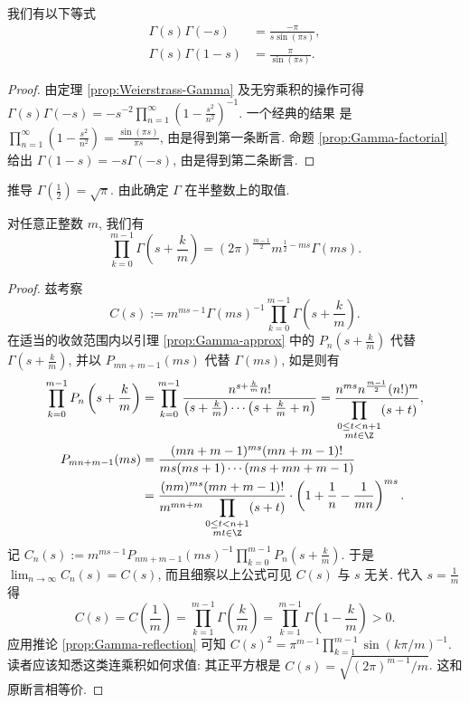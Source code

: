 \begin{corollary}\label{prop:Gamma-reflection}
	我们有以下等式
	\begin{align*}
		\Gamma(s)\Gamma(-s) & = \frac{-\pi}{s \sin(\pi s)}, \\
		\Gamma(s)\Gamma(1-s) & = \frac{\pi}{\sin(\pi s)}.
	\end{align*}
\end{corollary}
\begin{proof}
	由定理 \ref{prop:Weierstrass-Gamma} 及无穷乘积的操作可得 $\Gamma(s)\Gamma(-s) = -s^{-2} \prod_{n=1}^\infty \left( 1 - \frac{s^2}{n^2} \right)^{-1}$. 一个经典的结果 \cite[\S 1.7 (3)]{GW} 是 $\prod_{n=1}^\infty \left( 1 - \frac{s^2}{n^2} \right) = \frac{\sin(\pi s)}{\pi s}$, 由是得到第一条断言. 命题 \ref{prop:Gamma-factorial} 给出 $\Gamma(1-s) = -s\Gamma(-s)$, 由是得到第二条断言.
\end{proof}

\begin{exercise}
	推导 $\Gamma\left(\frac{1}{2}\right) = \sqrt{\pi}$. 由此确定 $\Gamma$ 在半整数上的取值.
\end{exercise}

\begin{theorem}[乘积公式]\label{prop:Gamma-mult}
	对任意正整数 $m$, 我们有
	\[ \prod_{k=0}^{m-1} \Gamma\left(s + \frac{k}{m} \right) = (2\pi)^{\frac{m-1}{2}} m^{\frac{1}{2} - ms} \Gamma(ms). \]
\end{theorem}
\begin{proof}
	兹考察
	\[ C(s) := m^{ms-1} \Gamma(ms)^{-1} \prod_{k=0}^{m-1} \Gamma\left(s + \frac{k}{m} \right). \]
	在适当的收敛范围内以引理 \ref{prop:Gamma-approx} 中的 $P_n\left(s + \frac{k}{m}\right)$ 代替 $\Gamma\left(s + \frac{k}{m}\right)$, 并以 $P_{mn+m-1}(ms)$ 代替 $\Gamma(ms)$, 如是则有
	\begin{align*}
		\prod_{k=0}^{m-1} P_n\left( s + \frac{k}{m} \right) & = \prod_{k=0}^{m-1} \dfrac{n^{s + \frac{k}{m}} n!}{\left(s + \frac{k}{m}\right) \cdots \left(s + \frac{k}{m} + n \right)} = \dfrac{ n^{ms} n^{\frac{m-1}{2}} (n!)^m }{ \displaystyle\prod_{\substack{0 \leq  t < n+1 \\ mt \in \Z}} (s + t) }, \\
		P_{mn+m-1}(ms) & = \dfrac{ (mn+m-1)^{ms} (mn+m-1)! }{ms (ms+1) \cdots (ms+mn+m-1)} \\
		& = \dfrac{ (nm)^{ms} (mn+m-1)! }{m^{mn+m} \displaystyle\prod_{\substack{0 \leq t < n+1 \\ mt \in \Z }} (s+t) } \cdot \left( 1 +\frac{1}{n} - \frac{1}{mn} \right)^{ms}.
	\end{align*}
	记 $C_n(s) := m^{ms-1} P_{nm+m-1}(ms)^{-1} \prod_{k=0}^{m-1} P_n\left(s + \frac{k}{m}\right)$. 于是 $\lim_{n \to \infty} C_n(s) = C(s)$, 而且细察以上公式可见 $C(s)$ 与 $s$ 无关. 代入 $s = \frac{1}{m}$ 得
	\[ C(s) =  C\left(\frac{1}{m} \right) = \prod_{k=1}^{m-1} \Gamma\left( \frac{k}{m} \right) =  \prod_{k=1}^{m-1} \Gamma\left(1 - \frac{k}{m} \right) > 0. \]
	应用推论 \ref{prop:Gamma-reflection} 可知 $C(s)^2 = \pi^{m-1} \prod_{k=1}^{m-1} \sin(k\pi/m)^{-1}$. 读者应该知悉这类连乘积如何求值: 其正平方根是 $C(s) = \sqrt{(2\pi)^{m-1}/m}$. 这和原断言相等价.
\end{proof}

